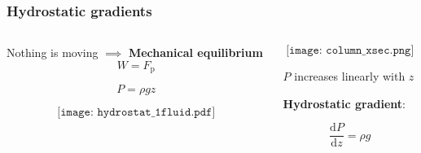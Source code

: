 \documentclass{beamer}
\begin{document}
\begin{frame}
  \frametitle{Hydrostatic gradients}

  \begin{columns}[t]

    \begin{column}{0.5\paperwidth}

      Nothing is moving $\implies$ \textbf{Mechanical equilibrium} \\

      $$ W = F_{\text{p}} $$

      $$ P = \rho g z $$

      $$\texttt{[image: hydrostat\_1fluid.pdf]}$$
      
    \end{column}

    \begin{column}{0.49\paperwidth}

      $$\texttt{[image: column\_xsec.png]}$$

      $P$ increases linearly with $z$ \\

      \vspace{0.5cm}
      
      \textbf{Hydrostatic gradient}:

      $$ \frac{\mathrm{d} P}{\mathrm{d} z} = \rho g $$
    \end{column}

  \end{columns}
  
\end{frame}
\end{document}
